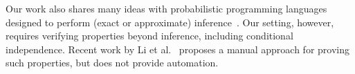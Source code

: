 Our work also shares many ideas with probabilistic programming
languages designed to perform (exact or approximate)
inference~\cite{holtzen2020scaling, carpenter2017stan, wood2014new,
  bingham2019pyro, albarghouthi2017fairsquare, de2007problog,
  pfeffer2009figaro, saad2021sppl}. Our setting, however, requires
verifying properties beyond inference, including conditional
independence. Recent work by Li et al.~\cite{li2023lilac} proposes a
manual approach for proving such properties, but does not provide
automation.

